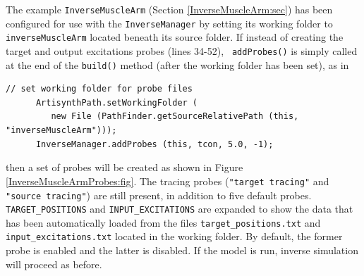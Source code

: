 The example {\tt InverseMuscleArm} (Section \ref{InverseMuscleArm:sec}) has
been configured for use with the {\tt InverseManager} by setting its working
folder to {\tt inverseMuscleArm} located beneath its source folder.  If instead
of creating the target and output excitations probes (lines 34-52), {\tt
addProbes()} is simply called at the end of the {\tt build()} method (after the
working folder has been set), as in
%
\begin{lstlisting}[]
      // set working folder for probe files
      ArtisynthPath.setWorkingFolder (
         new File (PathFinder.getSourceRelativePath (this, "inverseMuscleArm")));
      InverseManager.addProbes (this, tcon, 5.0, -1);
\end{lstlisting}
%
then a set of probes will be created as shown in
Figure \ref{InverseMuscleArmProbes:fig}. The tracing probes ({\tt "target
tracing"} and {\tt "source tracing"}) are still present, in addition to five
default probes. {\tt TARGET\_POSITIONS} and {\tt INPUT\_EXCITATIONS} are
expanded to show the data that has been automatically loaded from the files
{\tt target\_positions.txt} and \pdfbreak 
{\tt input\_excitations.txt} located in the
working folder. By default, the former probe is enabled and the latter is
disabled. If the model is run, inverse simulation will proceed as before.

